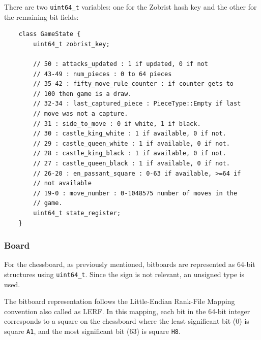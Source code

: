 \vspace{1em}

\noindent There are two \texttt{uint64\_t} variables: one for the Zobrist hash key and the other for the remaining bit fields:

\begin{lstlisting}
    class GameState {
        uint64_t zobrist_key;

        // 50 : attacks_updated : 1 if updated, 0 if not
        // 43-49 : num_pieces : 0 to 64 pieces
        // 35-42 : fifty_move_rule_counter : if counter gets to 
        // 100 then game is a draw.
        // 32-34 : last_captured_piece : PieceType::Empty if last
        // move was not a capture.
        // 31 : side_to_move : 0 if white, 1 if black.
        // 30 : castle_king_white : 1 if available, 0 if not.
        // 29 : castle_queen_white : 1 if available, 0 if not.
        // 28 : castle_king_black : 1 if available, 0 if not.
        // 27 : castle_queen_black : 1 if available, 0 if not.
        // 26-20 : en_passant_square : 0-63 if available, >=64 if
        // not available
        // 19-0 : move_number : 0-1048575 number of moves in the 
        // game.
        uint64_t state_register;
    }
\end{lstlisting}

\subsubsection{Board}

For the chessboard, as previously mentioned, bitboards are represented as 64-bit structures using \texttt{uint64\_t}. Since the sign is not relevant, an unsigned type is used.

\vspace{1em}

\noindent The bitboard representation follows the Little-Endian Rank-File Mapping convention also called as LERF. In this mapping, each bit in the 64-bit integer corresponds to a square on the chessboard where the least significant bit (0) is square \texttt{A1}, and the most significant bit (63) is square \texttt{H8}.

